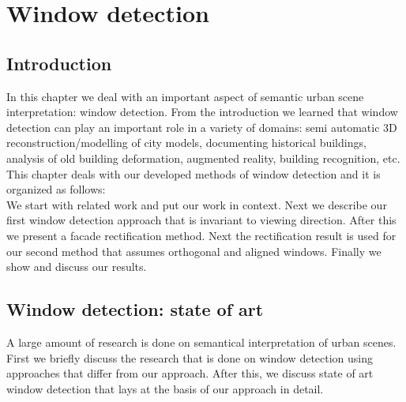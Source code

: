 
\section{Window detection}
\label{sec:windowDetection}
\subsection{Introduction}
In this chapter we deal with an important aspect of semantic urban scene interpretation: window detection. 
From the introduction we learned that window detection can play an important role in
a variety of domains: semi automatic 3D reconstruction/modelling of city models, documenting
historical buildings, analysis of old building deformation, augmented
reality, building recognition, etc.\\

This chapter deals with our developed methods of window detection and it is organized
as follows:\\
  We start with related work and put our work in context.  Next we describe our first
  window detection approach that is invariant to viewing direction.  After this
  we present a facade rectification method. Next the rectification result is used for our
  second method that assumes orthogonal and aligned windows.  Finally we show
  and discuss our results. 

\subsection{Window detection: state of art} %
A large amount of research is done on semantical interpretation of urban scenes. 
First we briefly discuss the research that is done on window detection using
approaches that differ from our approach.  After this, we discuss state of art
window detection that lays at the basis of our approach in detail.\\

